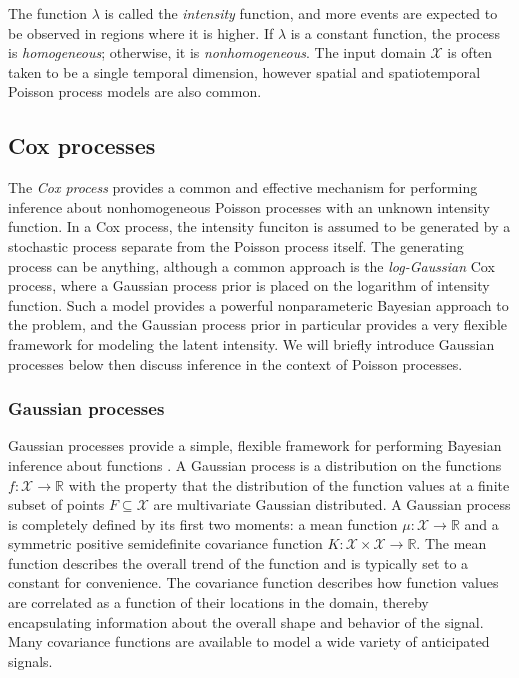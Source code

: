 \documentclass{article}
\newcommand{\cm}[1]{\mathcal{#1}}
\newcommand{\R}{\mathbb{R}}
\begin{document}
The function $\lambda$ is called the \emph{intensity} function, and
more events are expected to be observed in regions where it is higher.
If $\lambda$ is a constant function, the process is
\emph{homogeneous}; otherwise, it is \emph{nonhomogeneous}.  The input
domain $\cm{X}$ is often taken to be a single temporal dimension,
however spatial and spatiotemporal Poisson process models are also
common.

\subsection{Cox processes}

The \emph{Cox process} provides a common and effective mechanism for
performing inference about nonhomogeneous Poisson processes with an
unknown intensity function.  In a Cox process, the intensity funciton
is assumed to be generated by a stochastic process separate from the
Poisson process itself.  The generating process can be anything,
although a common approach is the \emph{log-Gaussian} Cox process,
where a Gaussian process prior is placed on the logarithm of intensity
function.  Such a model provides a powerful nonparameteric Bayesian
approach to the problem, and the Gaussian process prior in particular
provides a very flexible framework for modeling the latent intensity.
We will briefly introduce Gaussian processes below then discuss
inference in the context of Poisson processes.

\subsubsection{Gaussian processes}

Gaussian processes provide a simple, flexible framework for performing
Bayesian inference about functions \citep{gpml}.  A Gaussian process
is a distribution on the functions $f\colon \cm{X} \to \R$ with the
property that the distribution of the function values at a finite
subset of points $F \subseteq \cm{X}$ are multivariate Gaussian
distributed. A Gaussian process is completely defined by its first two
moments: a mean function $\mu\colon \cm{X} \to \R$ and a symmetric
positive semidefinite covariance function $K\colon \cm{X} \times
\cm{X} \to \R$.  The mean function describes the overall trend of the
function and is typically set to a constant for convenience.  The
covariance function describes how function values are correlated as a
function of their locations in the domain, thereby encapsulating
information about the overall shape and behavior of the signal.  Many
covariance functions are available to model a wide variety of
anticipated signals.
\end{document}
